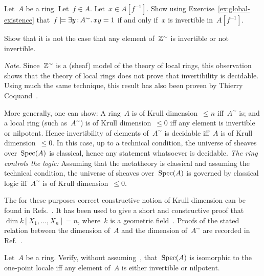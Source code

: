 \documentclass{ws-rv9x6}
\begin{document}
{\begin{exercise}%
Let~$A$ be a ring. Let~$f \in A$. Let~$x \in A[f^{-1}]$. Show using
Exercise~\ref{ex:global-existence} that~$f \models \exists y\,{:}\,A^\sim\mathpunct{.} xy
= 1$ if and only if~$x$ is invertible in~$A[f^{-1}]$.
\end{exercise}

\begin{exercise}%
Show that it is not the case that any element of~$\mathbb{Z}^\sim$ is invertible or
not invertible.\smallskip

{\noindent\scriptsize\emph{Note.} Since~$\mathbb{Z}^\sim$ is a (sheaf) model of the
theory of local rings, this observation shows that the theory of
local rings does not prove that invertibility is decidable. Using much the same
technique, this result has also been proven by Thierry
Coquand~\cite{coquand:local-rings}.

More generally, one can show: A ring~$A$ is of Krull dimension~$\leq n$
iff~$A^\sim$ is; and a local ring (such as~$A^\sim$) is of Krull
dimension~$\leq 0$ iff any element is invertible or nilpotent. Hence
invertibility of elements of~$A^\sim$ is decidable iff~$A$ is of Krull
dimension~$\leq 0$. In this case, up to a technical condition, the universe of
sheaves over~$\mathrm{Spec}(A)$ is classical, hence any statement whatsoever is
decidable. \emph{The ring controls the logic:} Assuming that the metatheory is
classical and assuming the technical condition, the universe of sheaves
over~$\mathrm{Spec}(A)$ is governed by classical logic iff~$A^\sim$ is of Krull
dimension~$\leq 0$.

The for these purposes correct constructive notion of Krull dimension can be
found in Refs.~.
It has been used to give a short and constructive proof that~$\dim
k[X_1,\ldots,X_n] = n$, where~$k$ is a geometric
field~\cite{coquand-lombardi:krull-dim-polynomial-ring}. Proofs of the stated
relation between the dimension of~$A$ and the dimension of~$A^\sim$ are recorded in
Ref.~\cite[Section~3.4]{blechschmidt:phd}.\par}
\end{exercise}

\begin{exercise}%
Let~$A$ be a ring. Verify, without assuming~\BPIT, that~$\mathrm{Spec}(A)$ is
isomorphic to the one-point locale iff any element of~$A$ is either
invertible or nilpotent.\smallskip


\end{exercise}}
\end{document}
